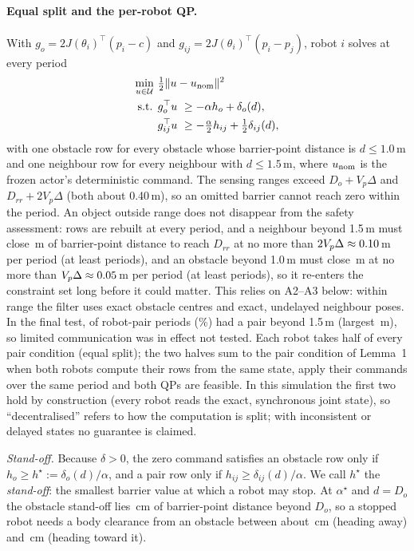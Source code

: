\documentclass[journal]{IEEEtran}
\begin{document}
\paragraph{Equal split and the per-robot QP.} With $g_o=2J(\theta_i)^\top(p_i-c)$ and
$g_{ij}=2J(\theta_i)^\top(p_i-p_j)$, robot $i$ solves at every period
\begin{equation}
\begin{aligned}
\min_{u\in\mathcal U}\ & \tfrac12\|u-u_{\rm nom}\|^2\\
\text{s.t. }& g_o^\top u\ \ge -\alpha h_o+\delta_o(d),\\
& g_{ij}^\top u\ \ge -\tfrac{\alpha}{2}h_{ij}+\tfrac12\delta_{ij}(d),
\end{aligned}
\end{equation}
with one obstacle row for every obstacle whose barrier-point distance is $d\le 1.0$\,m and one
neighbour row for every neighbour with $d\le 1.5$\,m, where $u_{\rm nom}$ is the frozen actor's deterministic command. The sensing ranges exceed
$D_o+V_p\Delta$ and $D_{rr}+2V_p\Delta$ (both about 0.40\,m), so an omitted barrier cannot reach zero
within the period. An object outside range does not disappear from the safety assessment: rows are
rebuilt at every period, and a neighbour beyond 1.5\,m must close \CommGapPair\,m of barrier-point
distance to reach $D_{rr}$ at no more than $2V_p\Delta\approx0.10$\,m per period (at least
\CommPeriodsPair{} periods), and an obstacle beyond 1.0\,m must close \CommGapObst\,m at no more than
$V_p\Delta\approx0.05$\,m per period (at least \CommPeriodsObst{} periods), so it re-enters the
constraint set long before it could matter. This relies on A2--A3 below: within range the filter uses
exact obstacle centres and exact, undelayed neighbour poses. In the final test, \CommBeyond{} of
\CommPairPeriods{} robot-pair periods (\CommBeyondPct\%) had a pair beyond 1.5\,m (largest
\CommMaxPair\,m), so limited communication was in effect not tested. Each robot takes half of every pair condition (equal split); the two halves sum to the pair
condition of Lemma~1 when both robots compute their rows from the same state, apply their commands over
the same period and both QPs are feasible. In this simulation the first two hold by construction (every
robot reads the exact, synchronous joint state), so ``decentralised'' refers to how the computation is
split; with inconsistent or delayed states no guarantee is claimed.

\emph{Stand-off.} Because $\delta>0$, the zero command satisfies an obstacle row only if
$h_o\ge h^\star:=\delta_o(d)/\alpha$, and a pair row only if $h_{ij}\ge\delta_{ij}(d)/\alpha$. We call
$h^\star$ the \emph{stand-off}: the smallest barrier value at which a robot may stop. At $\alpha^\star$
and $d=D_o$ the obstacle stand-off lies \StandOffObstCm\,cm of barrier-point distance beyond $D_o$, so a
stopped robot needs a body clearance from an obstacle between about \CoverBandLoCm\,cm (heading away)
and \CoverBandHiCm\,cm (heading toward it).
\end{document}
